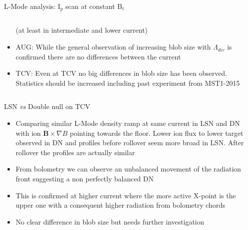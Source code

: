 \documentclass[10pt, compress]{beamer}
\begin{document}
\begin{frame}{L-Mode analysis: I$_p$ scan at constant B$_{t}$}
\begin{columns}
\begin{column}{0.35\textwidth}
\begin{itemize}
        (at least in intermediate and lower current)
      \item<10|only@10> AUG: While the general observation of increasing
        blob size with $\Lambda_{div}$ is confirmed there are no
        differences between the current
      \item<11|only@11> TCV: Even at TCV no big differences in blob
        size has been observed. Statistics should be increased
        including past experiment from MST1-2015 
      \end{itemize}
    \end{column}
\end{columns}
\end{frame}

\begin{frame}{LSN \textit{vs} Double null on TCV}
      \begin{itemize}
        \item<1|only@1> Comparing similar L-Mode density ramp at same
          current in LSN and DN with ion $\mathbf{B}\times\nabla B$
          pointing towards the floor. Lower ion flux to lower target
          observed in DN and profiles before rollover seem more broad
          in LSN. After rollover the profiles are actually similar
      \item<2|only@2>  From bolometry we can observe an
          unbalanced movement of the radiation front suggesting a non
          perfectly balanced DN
      \item<3|only@3> This is confirmed at higher current where the
        more active X-point is the upper one with a consequent higher
        radiation from bolometry chords
      \item<4|only@4> No clear difference in blob size but needs
        further investigation  
      \end{itemize}
\end{frame} 
\end{document}
